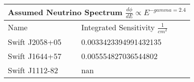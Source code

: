 \documentclass[]{article}
\begin{document}
\begin{tabular}{ |p{3.5cm}||p{4.5cm}|} 
\hline 
\multicolumn{2}{|c|}{Assumed Neutrino Spectrum $ \frac {d \phi}{dE} \propto E ^ {-gamma=2.4} $} \\ 
\hline 
Name&Integrated Sensitivity $\frac{1}{cm^{2}} $ \\ 
\hline 
Swift J2058+05 & \num[round-precision=2, round-mode=figures, scientific-notation=true]{0.0033423394991432135}  \\ 
Swift J1644+57 & \num[round-precision=2, round-mode=figures, scientific-notation=true]{0.005554827036544802}  \\ 
Swift J1112-82 & \num[round-precision=2, round-mode=figures, scientific-notation=true]{nan}  \\ 
\hline 
\end{tabular} 
\end{document}
